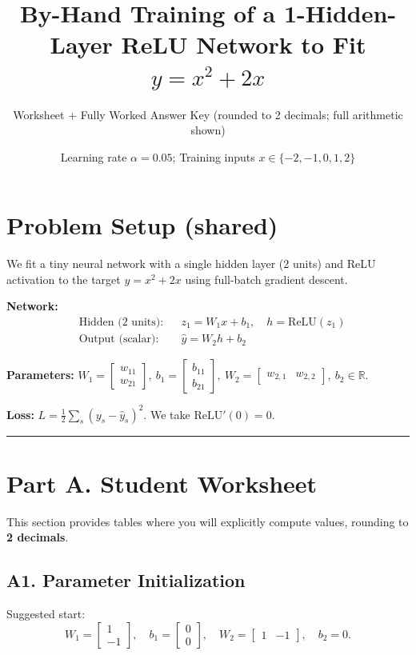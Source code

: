 \documentclass[11pt]{article}
\title{By-Hand Training of a 1-Hidden-Layer ReLU Network to Fit $y=x^2+2x$}
\author{Worksheet + Fully Worked Answer Key (rounded to 2 decimals; full arithmetic shown)}
\date{Learning rate $\alpha=0.05$; Training inputs $x\in\{-2,-1,0,1,2\}$}
\newcommand{\relu}{\mathrm{ReLU}}
\begin{document}
\maketitle

\section*{Problem Setup (shared)}
We fit a tiny neural network with a single hidden layer (2 units) and ReLU activation to the target $y=x^2+2x$ using full-batch gradient descent.

\noindent\textbf{Network:}
\begin{align*}
&\text{Hidden (2 units):} && z_1 = W_1 x + b_1,\quad h = \relu(z_1)\\
&\text{Output (scalar):} && \hat y = W_2 h + b_2
\end{align*}

\noindent\textbf{Parameters:}
$W_1=\begin{bmatrix}w_{11}\\w_{21}\end{bmatrix},\ 
b_1=\begin{bmatrix}b_{11}\\b_{21}\end{bmatrix},\ 
W_2=\begin{bmatrix}w_{2,1} & w_{2,2}\end{bmatrix},\ 
b_2\in\mathbb{R}.$

\noindent\textbf{Loss:}
$L=\tfrac12\sum_s (y_s-\hat y_s)^2.$ We take $\relu'(0)=0$.

\bigskip\hrule\bigskip

\section*{Part A. Student Worksheet}

This section provides tables where you will explicitly compute values, rounding to \textbf{2 decimals}.

\subsection*{A1. Parameter Initialization}
Suggested start:
\[
W_1=\begin{bmatrix}1\\-1\end{bmatrix},\quad b_1=\begin{bmatrix}0\\0\end{bmatrix},\quad W_2=\begin{bmatrix}1 & -1\end{bmatrix},\quad b_2=0.
\]
\end{document}
